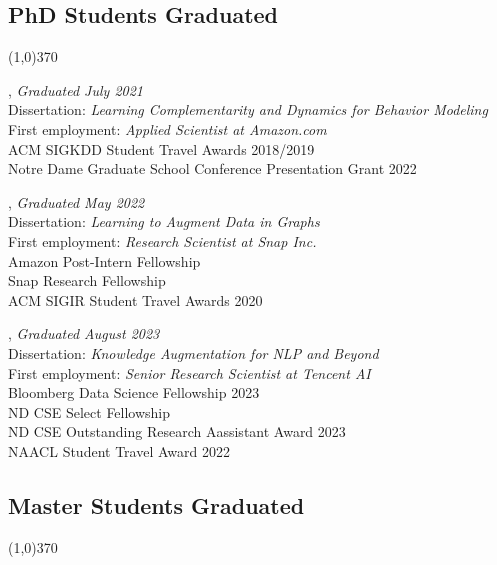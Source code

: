 \documentclass[10pt]{article}
\newenvironment{myindentpar}[1]%
{\begin{list}{}%
         {\setlength{\leftmargin}{#1}}%
         \item[]%
}
{\end{list}}
\newcounter{list}
\begin{document}
\subsection{\sc PhD Students Graduated}
\vspace{-0.4cm} \line(1,0){370} \vspace{-0.1cm}

\begin{myindentpar}{0.75cm}

\hspace{-0.75cm}{\bf Daheng Wang}, \textit{Graduated July 2021} \\
	{Dissertation: \textit{Learning Complementarity and Dynamics for Behavior Modeling}} \\
	{First employment: \textit{Applied Scientist at Amazon.com}} \\
	{ACM SIGKDD Student Travel Awards 2018/2019} \\
	{Notre Dame Graduate School Conference Presentation Grant 2022}

\hspace{-0.75cm}{\bf Tong Zhao}, \textit{Graduated May 2022} \\
	{Dissertation: \textit{Learning to Augment Data in Graphs}} \\
	{First employment: \textit{Research Scientist at Snap Inc.}} \\	
	{Amazon Post-Intern Fellowship} \\
	{Snap Research Fellowship} \\	
	{ACM SIGIR Student Travel Awards 2020}

\hspace{-0.75cm}{\bf Wenhao Yu}, \textit{Graduated August 2023} \\
	{Dissertation: \textit{Knowledge Augmentation for NLP and Beyond}} \\
	{First employment: \textit{Senior Research Scientist at Tencent AI}} \\	
	{Bloomberg Data Science Fellowship 2023} \\
	{ND CSE Select Fellowship} \\
	{ND CSE Outstanding Research Aassistant Award 2023} \\
	{NAACL Student Travel Award 2022}

\end{myindentpar}
	
\subsection{\sc Master Students Graduated}
\vspace{-0.4cm} \line(1,0){370} \vspace{-0.1cm}
\end{document}
